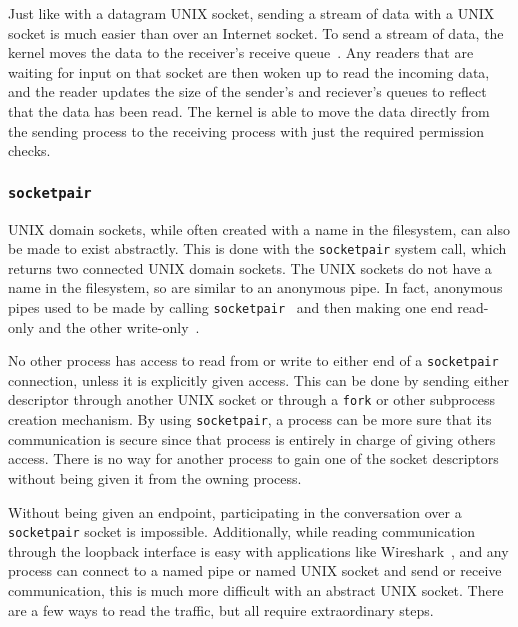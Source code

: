 Just like with a datagram UNIX socket, sending a stream of data with a UNIX socket is much easier than over an Internet socket.  To send a stream of data, the kernel moves the data to the receiver's receive queue~\cite[p 265--268]{Stevens:1996:TIT:233130}.  Any readers that are waiting for input on that socket are then woken up to read the incoming data, and the reader updates the size of the sender's and reciever's queues to reflect that the data has been read.  The kernel is able to move the data directly from the sending process to the receiving process with just the required permission checks.

\subsubsection{\texttt{socketpair}}
\label{sec:socketpair}
UNIX domain sockets, while often created with a name in the filesystem, can also be made to exist abstractly.  This is done with the \texttt{socketpair} system call, which returns two connected UNIX domain sockets.  The UNIX sockets do not have a name in the filesystem, so are similar to an anonymous pipe.  In fact, anonymous pipes used to be made by calling \texttt{socketpair}~\cite{apple_2005} and then making one end read-only and the other write-only~\cite[p 253]{Stevens:1996:TIT:233130}.

No other process has access to read from or write to either end of a \texttt{socketpair} connection, unless it is explicitly given access.  This can be done by sending either descriptor through another UNIX socket or through a \texttt{fork} or other subprocess creation mechanism.  By using \texttt{socketpair}, a process can be more sure that its communication is secure since that process is entirely in charge of giving others access.  There is no way for another process to gain one of the socket descriptors without being given it from the owning process.

Without being given an endpoint, participating in the conversation over a \texttt{socketpair} socket is impossible.  Additionally, while reading communication through the loopback interface is easy with applications like Wireshark~\cite{wireshark}, and any process can connect to a named pipe or named UNIX socket and send or receive communication, this is much more difficult with an abstract UNIX socket.  There are a few ways to read the traffic, but all require extraordinary steps.

